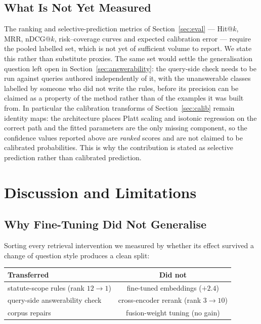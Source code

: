 \documentclass[conference]{IEEEtran}
\begin{document}
\subsection{What Is Not Yet Measured}
\label{sec:notmeasured}
The ranking and selective-prediction metrics of Section~\ref{sec:eval} ---
Hit@$k$, MRR, nDCG@$k$, risk--coverage curves and expected calibration error ---
require the pooled labelled set, which is not yet of sufficient volume to report.
We state this rather than substitute proxies. The same set would settle the
generalisation question left open in Section~\ref{sec:answerability}: the
query-side check needs to be run against queries authored independently of it,
with the unanswerable classes labelled by someone who did not write the rules,
before its precision can be claimed as a property of the method rather than of
the examples it was built from. In particular the calibration
transforms of Section~\ref{sec:calib} remain identity maps: the architecture
places Platt scaling and isotonic regression on the correct path and the fitted
parameters are the only missing component, so the confidence values reported
above are \emph{ranked} scores and are not claimed to be calibrated
probabilities. This is why the contribution is stated as selective prediction
rather than calibrated prediction.

\section{Discussion and Limitations}
\label{sec:disc}

\subsection{Why Fine-Tuning Did Not Generalise}
\label{sec:whynot}
Sorting every retrieval intervention we measured by whether its effect
survived a change of question style produces a clean split:

\begin{center}
\small
\begin{tabular}{@{}lc@{}}
\toprule
Transferred & Did not \\
\midrule
statute-scope rules (rank $12\!\to\!1$) & fine-tuned embeddings ($+2.4$) \\
query-side answerability check & cross-encoder rerank (rank $3\!\to\!10$) \\
corpus repairs & fusion-weight tuning (no gain) \\
\bottomrule
\end{tabular}
\end{center}
\end{document}
